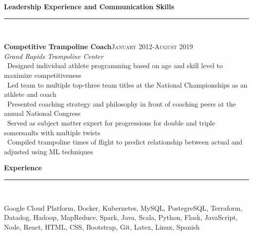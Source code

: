 \documentclass[a4paper,10pt]{article}
\newcommand{\horizontalline}{{\rule{533pt}{0.625pt}\\}}
\renewcommand{\section}[1]{{\noindent\textbf{\large #1}\\\horizontalline}}
\renewcommand{\subsection}[2]{{\noindent \textbf{#1}\hfill \textsc{#2}\\}}
\begin{document}
\section{Leadership Experience and Communication Skills}
\subsection{Competitive Trampoline Coach}{January 2012-August 2019}
\textit{Grand Rapids Trampoline Center}\\
\textbullet\ Designed individual athlete programming based on age and skill level to maximize competitiveness\\
\textbullet\ Led team to multiple top-three team titles at the National Championships as an athlete and coach\\
\textbullet\ Presented coaching strategy and philosophy in front of coaching peers at the annual National Congress\\
\textbullet\ Served as subject matter expert for progressions for double and triple somersaults with multiple twists\\
\textbullet\ Compiled trampoline times of flight to predict relationship between actual and adjusted using ML techniques\\

\section{Experience}
Google Cloud Platform, Docker, Kubernetes, MySQL, PostegreSQL, Terraform, Datadog, Hadoop, MapReduce, Spark, Java, Scala, Python, Flask, JavaScript, Node, React, HTML, CSS, Bootstrap, Git, Latex, Linux, Spanish\\
\end{document}
